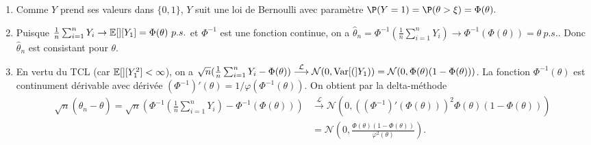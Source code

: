 \begin{solution}
  \begin{enumerate}
    \item
          Comme $Y$ prend ses valeurs dans $\{0,1\}$, $Y$ suit une loi de Bernoulli avec
          param\`etre $\P(Y=1) = \P(\theta>\xi) = \Phi(\theta).$

    \item
          Puisque $\frac1n\sum_{i=1}^nY_i\to\mathbb{E}[][Y_1]=\Phi(\theta)~p.s.$ et $\Phi^{-1}$ est
          une fonction continue, on a $\hat \theta_n=\Phi^{-1}(\frac1n\sum_{i=1}^nY_i)\to
            \Phi^{-1}(\Phi(\theta))=\theta~p.s.$. Donc $\hat\theta_n$ est consistant pour
          $\theta$.

    \item
          En vertu du TCL (car $\mathbb{E}[][Y^2_1]<\infty$), on a $\sqrt
            n(\frac1n\sum_{i=1}^nY_i-\Phi(\theta))\stackrel{\mathcal
              L}\longrightarrow\mathcal N(0,\operatorname{Var}[(]Y_1))=\mathcal
            N(0,\Phi(\theta)(1-\Phi(\theta)))$. La fonction $\Phi^{-1}(\theta)$ est
          continument d\'erivable avec d\'eriv\'ee $(\Phi^{-1})'(\theta) =
            1/\varphi(\Phi^{-1}(\theta))$. On obtient par la delta-m\'ethode
          \begin{align*}
            \sqrt n(\hat\theta_n-\theta) =\sqrt n\left(\Phi^{-1}\left(\frac1n\sum_{i=1}^nY_i\right)-\Phi^{-1}(\Phi(\theta))\right)
             & \stackrel{\mathcal L}\longrightarrow \mathcal N(0, ((\Phi^{-1})'(\Phi(\theta)))^2   \Phi(\theta)(1-\Phi(\theta))) \\
             & =\mathcal N\left(0, \frac{  \Phi(\theta)(1-\Phi(\theta))}{ \varphi^2(\theta)}\right).
          \end{align*}

  \end{enumerate}

\end{solution}